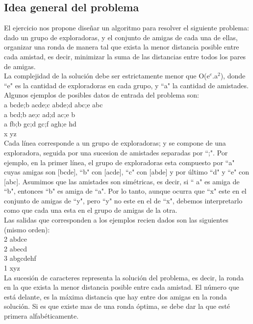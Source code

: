\subsection{Idea general del problema}
El ejercicio nos propone diseñar un algoritmo para resolver el siguiente problema: dado un grupo de exploradoras, y el conjunto 
de amigas de cada una de ellas, organizar una ronda de manera tal que exista la menor distancia posible entre cada amistad, es 
decir, minimizar la suma de las distancias entre todos los pares de amigas.\\
La complejidad de la solución debe ser estrictamente menor que O(e$^e$.a$^2$), donde ``e"$ $ es la cantidad de exploradoras en cada grupo, y ``a"$ $ la cantidad de amistades. \\

Algunos ejemplos de posibles datos de entrada del problema son: \\
a bcde;b acde;c abde;d abc;e abc \\
a bcd;b ae;c ad;d ac;e b \\
a fb;b gc;d gc;f agh;e hd \\
x yz \\

Cada línea corresponde a un grupo de exploradoras; y se compone de una exploradora, seguida por una sucesion de amistades
separadas por ``;"$ $. Por ejemplo, en la primer línea, el grupo de exploradoras esta compuesto por ``a"$ $ cuyas amigas son [bcde],
``b"$ $ con [acde], ``c"$ $ con [abde] y por último ``d"$ $ y ``e"$ $ con  [abc]. Asumimos que las amistades son simétricas, es decir, si ``
a"$ $ es amiga de ``b"$ $, entonces ``b"$ $ es amiga de ``a"$ $. Por lo tanto, aunque ocurra que ``x"$ $ este en el conjunto de amigas 
de ``y"$ $, pero ``y"$ $ no este en el de ``x"$ $, debemos interpretarlo como que cada una esta en el grupo de amigas de la otra.  \\

Las salidas que corresponden a los ejemplos recien dados son las siguientes (mismo orden): \\
2 abdce \\
2 abecd \\
3 abgcdehf \\
1 xyz \\

La sucesión de caracteres representa la solución del problema, es decir, la ronda en la que exista la menor distancia posible entre cada 
amistad. El número que está delante, es la máxima distancia que hay entre dos amigas en la ronda solución. Si es que existe mas de una 
ronda óptima, se debe dar la que esté primera alfabéticamente. 

